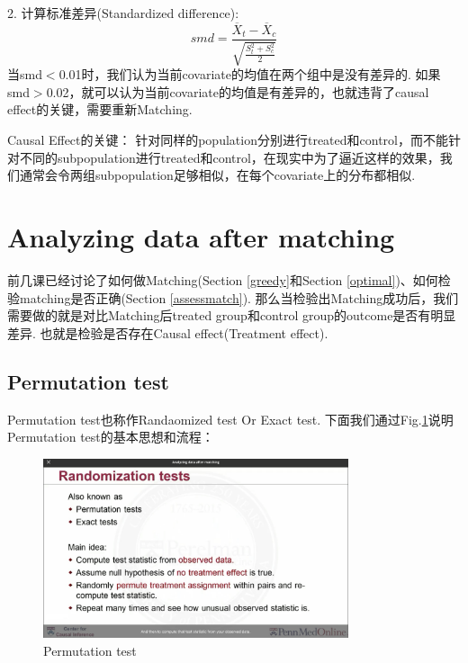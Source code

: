 2. 计算标准差异(Standardized difference):
\begin{equation}
smd= \frac{\overline{X}_{t}-\overline{X}_{c}}{\sqrt{\frac{S_{t}^{2}+S_{c}^{2}}{2}}}
\end{equation}
当smd$<$0.01时，我们认为当前covariate的均值在两个组中是没有差异的. 如果smd$>$0.02，就可以认为当前covariate的均值是有差异的，也就违背了causal effect的关键，需要重新Matching.
\begin{note}
Causal Effect的关键：
针对同样的population分别进行treated和control，而不能针对不同的subpopulation进行treated和control，在现实中为了逼近这样的效果，我们通常会令两组subpopulation足够相似，在每个covariate上的分布都相似.
\end{note}

\section{Analyzing data after matching}
前几课已经讨论了如何做Matching(Section \ref{greedy}和Section \ref{optimal})、如何检验matching是否正确(Section \ref{assessmatch}). 那么当检验出Matching成功后，我们需要做的就是对比Matching后treated group和control group的outcome是否有明显差异. 也就是检验是否存在Causal effect(Treatment effect).

\subsection{Permutation test}
Permutation test也称作Randaomized test Or Exact test.
下面我们通过Fig.\ref{pertest}说明Permutation test的基本思想和流程：
\begin{figure}
	\setlength{\abovecaptionskip}{0pt}     %
	\setlength{\belowcaptionskip}{10pt}
	\vspace{-0cm}  %
	\setlength{\abovecaptionskip}{-0cm}   %
	\setlength{\belowcaptionskip}{-0cm}   %
	\centering
	\includegraphics[width=0.8\textwidth]{figure/pertest.jpg}
	\caption{Permutation test}
	\label{pertest}
\end{figure}


